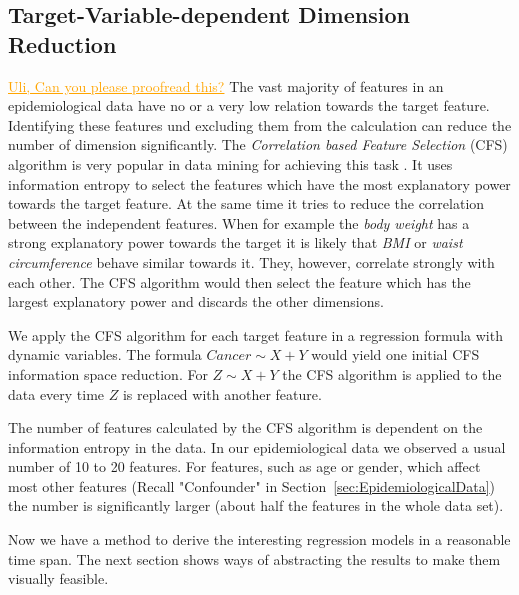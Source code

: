 \documentclass[journal]{style/vgtc} 			          %
\newcommand{\com}[1]{\textcolor{orange}{\uline{#1}}}
\begin{document}
\subsection{Target-Variable-dependent Dimension Reduction}
\com{Uli, Can you please proofread this?}
The vast majority of features in an epidemiological data have no or a very low relation towards the target feature.
Identifying these features und excluding them from the calculation can reduce the number of dimension significantly.
The \emph{Correlation based Feature Selection} (CFS) algorithm is very popular in data mining for achieving this task \cite{CFS}.
It uses information entropy to select the features which have the most explanatory power towards the target feature.
At the same time it tries to reduce the correlation between the independent features.
When for example the \emph{body weight} has a strong explanatory power towards the target it is likely that \emph{BMI} or \emph{waist circumference} behave similar towards it.
They, however, correlate strongly with each other.
The CFS algorithm would then select the feature which has the largest explanatory power and discards the other dimensions.

We apply the CFS algorithm for each target feature in a regression formula with dynamic variables.
The formula $Cancer \sim X + Y$ would yield one initial CFS information space reduction.
For $Z \sim X + Y$ the CFS algorithm is applied to the data every time $Z$ is replaced with another feature.

The number of features calculated by the CFS algorithm is dependent on the information entropy in the data.
In our epidemiological data we observed a usual number of 10 to 20 features.
For features, such as age or gender, which affect most other features (Recall "Confounder" in Section~\ref{sec:EpidemiologicalData}) the number is significantly larger (about half the features in the whole data set).

Now we have a method to derive the interesting regression models in a reasonable time span.
The next section shows ways of abstracting the results to make them visually feasible.
\end{document}
